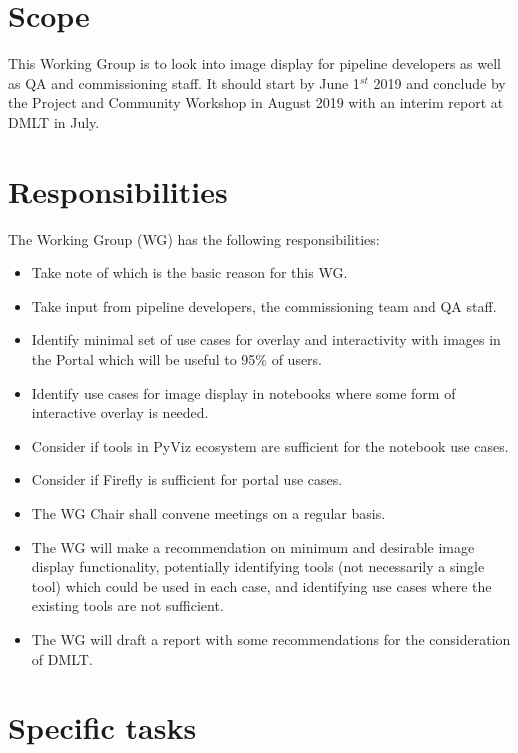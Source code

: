 \section{Scope}

This Working Group is to look into image display for pipeline developers as well as \gls{QA} and commissioning staff.
It should start by June  1$^{st}$ 2019 and conclude by the Project and Community Workshop in August 2019 with an interim report at \gls{DMLT} in July.


\section{Responsibilities}

The Working Group (\gls{WG}) has the following responsibilities:

\begin{itemize}
 \item Take note of  which is the basic reason for this \gls{WG}.
 \item Take input from pipeline developers, the commissioning team and \gls{QA} staff.
 \item Identify minimal set of use cases for overlay and interactivity with images in the Portal which will be useful to 95\% of users.
 \item Identify use cases for image display in notebooks where some form of interactive overlay is needed.
 \item Consider if tools in PyViz ecosystem are sufficient for the notebook use cases.
 \item Consider if Firefly is sufficient for portal use cases.
 \item The \gls{WG} Chair shall convene meetings on a regular basis.
 \item The \gls{WG} will make a recommendation on minimum and desirable image display functionality, potentially identifying tools (not necessarily a single tool) which could be used in each case, and identifying use cases where the existing tools are not sufficient.
 \item The \gls{WG} will draft a report with some recommendations for the consideration of \gls{DMLT}.
\end{itemize}


\section{Specific tasks}


